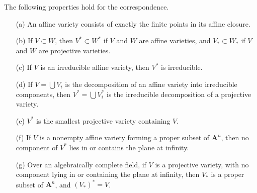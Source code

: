 \begin{theorem}
    The following properties hold for the correspondence.
    \begin{enumerate}
        \item[(a)] An affine variety consists of exactly the finite points in its affine closure.
        \item[(b)] If $V \subset W$, then $V^* \subset W^*$ if $V$ and $W$ are affine varieties, and $V_* \subset W_*$ if $V$ and $W$ are projective varieties.
        \item[(c)] If $V$ is an irreducible affine variety, then $V^*$ is irreducible.
        \item[(d)] If $V = \bigcup V_i$ is the decomposition of an affine variety into irreducible components, then $V^* = \bigcup V_i^*$ is the irreducible decomposition of a projective variety.
        \item[(e)] $V^*$ is the smallest projective variety containing $V$.
        \item[(f)] If $V$ is a nonempty affine variety forming a proper subset of $\mathbf{A}^n$, then no component of $V^*$ lies in or contains the plane at infinity.
        \item[(g)] Over an algebraically complete field, if $V$ is a projective variety, with no component lying in or containing the plane at infinity, then $V_*$ is a proper subset of $\mathbf{A}^n$, and $(V_*)^* = V$.
    \end{enumerate}
\end{theorem}
